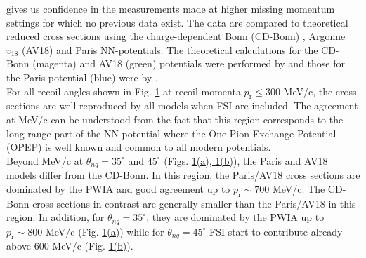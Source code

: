 gives us confidence in the measurements made at higher missing momentum settings for which no previous data exist.
The data are compared to theoretical reduced
cross sections using the charge-dependent Bonn (CD-Bonn) \cite{PhysRevC.63.024001}, Argonne $v_{18}$ (AV18) \cite{PhysRevC.51.38} and Paris \cite{PhysRevC.21.861} NN-potentials. The theoretical calculations
for the CD-Bonn (magenta) and AV18 (green) potentials were performed by \DIFdelbegin {}\DIFdelend \DIFaddbegin {}\DIFaddend and those for the Paris potential (blue) were by \DIFdelbegin {}\DIFdelend \DIFaddbegin {}\DIFaddend .\\
\indent For all recoil angles shown in Fig. \hyperref[fig:fig1]{1} at recoil momenta $p_{\mathrm{r}}\leq300$ MeV/c, the cross sections are well reproduced  by  all models when FSI are included.
The agreement at \DIFdelbegin {}\DIFdelend \DIFaddbegin {}\DIFaddend MeV/c can be understood from the fact that this region corresponds to the long-range part of the NN potential where the One Pion Exchange Potential (OPEP)
is well known and common to all modern potentials. \\
\indent Beyond \DIFdelbegin {}\DIFdelend \DIFaddbegin {}\DIFaddend MeV/c at $\theta_{nq}=35^{\circ}$ and $45^{\circ}$ (Figs. \hyperref[fig:fig1]{1(a), 1(b)}), the Paris and
AV18 models \DIFdelbegin {}\DIFdelend \DIFaddbegin {}\DIFaddend differ from the CD-Bonn. In this region, the Paris/AV18 cross sections are dominated by the PWIA and \DIFdelbegin {}\DIFdelend \DIFaddbegin {}\DIFaddend good agreement up to $p_{\mathrm{r}}\sim700$ MeV/c. The CD-Bonn cross sections in contrast are generally smaller than the Paris/AV18 in this region.  In addition, for $\theta_{nq}=35^{\circ}$, they are dominated by the PWIA up to $p_{\mathrm{r}}\sim800$ MeV/c (Fig. \hyperref[fig:fig1]{1(a)})  while for $\theta_{nq}=45^{\circ}$  FSI start to contribute already above 600 MeV/c (Fig. \hyperref[fig:fig1]{1(b)}).\DIFdelbegin {}\DIFdelend \DIFaddbegin \\
